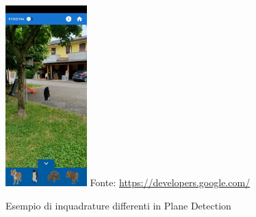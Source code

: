 \documentclass[crop=false, class=book]{standalone}
\begin{document}
\begin{figure}
{				{\includegraphics[width=0.28\textwidth]{../../resources/images/AnchorTrackable/pinglontano2.jpg}}
			}{Fonte: \url{https://developers.google.com/}}	
			\caption{Esempio di inquadrature differenti in Plane Detection}
			\label{fig:augm_img}
	\end{figure}	
	
\end{document}
